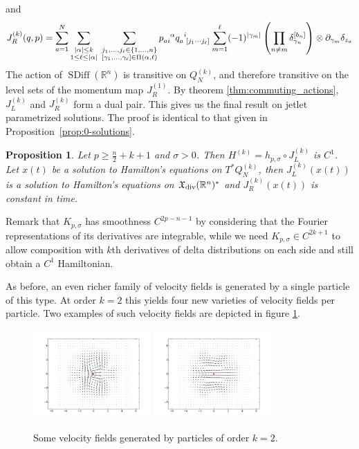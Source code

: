 \documentclass[12pt]{amsart}
\newcommand{\R}{\ensuremath{\mathbb{R}}}
\newtheorem{prop}[thm]{Proposition}
\DeclareMathOperator{\SDiff}{SDiff}
\begin{document}
  and
  \begin{equation*}
    J_R^{(k)}(q,p) = \sum_{a=1}^{N}
    \sum_{\substack{ |\alpha| \leq k \\ 1 \leq \ell \leq |\alpha| }} \;
		\sum_{
			\substack{
				j_1,\dots,j_\ell \in \{1,\dots,n\} \\
				[\gamma_1,\dots,\gamma_\ell] \in \Pi(\alpha,\ell)
				}
			}
			p\indices{_a_i^\alpha} q\indices{_a^i_{[j_1 \cdots j_\ell]}}
      \sum_{m=1}^\ell (-1)^{|\gamma_m|}\left( \prod_{n \neq m}  \delta_{\gamma_n}^{[b_n]} \right) \otimes \partial_{\gamma_m}\delta_{z_a}
  \end{equation*}
  The action of $\SDiff(\R^n)$ is transitive on $Q_N^{(k)}$, and
  therefore transitive on the level sets of the momentum map $J_R^{(1)}$.
  By theorem \ref{thm:commuting_actions}, $J_L^{(k)}$ and $J_R^{(k)}$ form a dual pair.
  This gives us the final result on jetlet parametrized solutions.
  The proof is identical to that given in Proposition~\ref{prop:0-solutions}.
  \begin{prop}\label{prop:k-solutions}
    Let $p \ge \frac{n}{2} + k + 1$ and $\sigma > 0$.
    Then $H^{(k)} = h_{p,\sigma} \circ J_L^{(k)}$ is $C^1$.
    Let $x(t)$ be a solution to Hamilton's equations on
    $T^*Q^{(k)}_N$, then $J_L^{(k)}( x(t))$ is a solution to Hamilton's
    equations on $\mathfrak{X}_{\rm div}(\R^n)^*$
    and $J_R^{(k)}( x(t))$ is constant in time.
  \end{prop}
  Remark that $K_{p,\sigma}$ has smoothness $C^{2p-n-1}$ by considering
  that the Fourier representations of its derivatives are integrable,
  while we need $K_{p,\sigma} \in C^{2k+1}$ to allow composition with
  $k$th derivatives of delta distributions on each side and still
  obtain a $C^1$ Hamiltonian.

  As before, an even richer family of velocity fields is generated by a single particle of this type.
  At order $k=2$ this yields four new varieties of velocity fields per particle.
  Two examples of such velocity fields are depicted in figure \ref{fig:2_jet}.
  
  \begin{figure}[h!]
  	\centering
	\includegraphics[width=0.4\textwidth]{two_jet_a_2D.pdf}
	\includegraphics[width=0.4\textwidth]{two_jet_b_2D.pdf}
	\caption{Some velocity fields generated by particles of order $k=2$.}
	\label{fig:2_jet}
  \end{figure}
  
\end{document}
